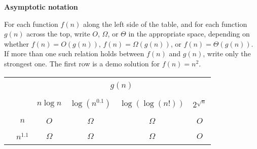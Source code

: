 \documentclass[12pt,twoside]{article}
\begin{document}
\begin{problem}{20}
\textbf{Asymptotic notation} 

For each function $f(n)$ along the left side of the table,
and for each function $g(n)$ across the top, write $O$,
$\Omega$, or $\Theta$ in the appropriate space, depending on whether
$f(n)=O(g(n))$, $f(n)=\Omega(g(n))$, or $f(n)=\Theta(g(n))$.
If more than one such relation holds between $f(n)$ and $g(n)$,
write only the strongest one. The first row is a demo solution for $f(n)=n^2$.

\ifshowsolutions 
\begin{center}
\begin{tabular}{|c|c||c|c|c|c|}
\cline{3-6}
\multicolumn{2}{c||}{} & \multicolumn{4}{c|}{} \\
\multicolumn{2}{c||}{} & \multicolumn{4}{c|}{$g(n)$} \\
\multicolumn{2}{c||}{} & \multicolumn{4}{c|}{} \\
\cline{3-6}
\multicolumn{2}{c||}{}
                   & \hspace*{1in} & \hspace*{1in} & \hspace*{1in} & \hspace*{1in}\\
\multicolumn{2}{c||}{}
                   &       $n\log{n}$       &  $\log(n^{0.1})$     &      $\log(\log(n!))$   &   $2^{\sqrt{n}}$ \\
\multicolumn{2}{c||}{}
                   &                 &                 &             &  \\
\hline
\hline
\hspace*{0.5in}
&                    & \hspace*{1in} & \hspace*{1in} & \hspace*{1in} &\\
& $n$               & $O$    & $\Omega$    & $\Omega$ & $O$   \\
&                    &               &                 &             &   \\
\cline{2-6}
&                    & \hspace*{1in} & \hspace*{1in} & \hspace*{1in}&\\
& $n^{1.1}$           &      $\Omega$      &       $\Omega$            &      $\Omega$    &   $O$    \\
&                    &                 &                 &             &   \\

\end{tabular}
\end{center}
\end{problem}
\end{document}
